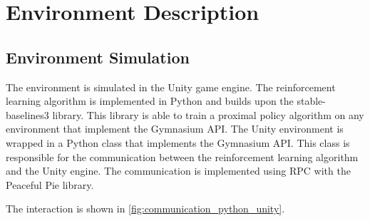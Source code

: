 \section{Environment Description}
\label{cha:env_description}

\subsection{Environment Simulation}
\label{sec:env_simulation}

The environment is simulated in the Unity game engine. The reinforcement learning algorithm is implemented in Python and builds upon the stable-baselines3 library. This library is able to train a proximal policy algorithm on any environment that implement the Gymnasium API. The Unity environment is wrapped in a Python class that implements the Gymnasium API. This class is responsible for the communication between the reinforcement learning algorithm and the Unity engine. The communication is implemented using \acs{RPC} with the Peaceful Pie \textcite{peacefulpie} library.

The interaction is shown in \ref{fig:communication_python_unity}.

\newcommand{\arenaImg}[1]{\texttt{[image: Bilder/image\_printer\_images/agent\_interaction/step\_\#1\_arena.png]}}
\newcommand{\agentImg}[1]{\texttt{[image: Bilder/image\_printer\_images/agent\_interaction/step\_\#1\_image\_from\_unity.png]}}

\newcommand\yOffsetc{-6.5}
\newcommand\xOffsetc{4.5}
\newcommand\envWidth{12}

\usetikzlibrary{decorations.pathreplacing}

